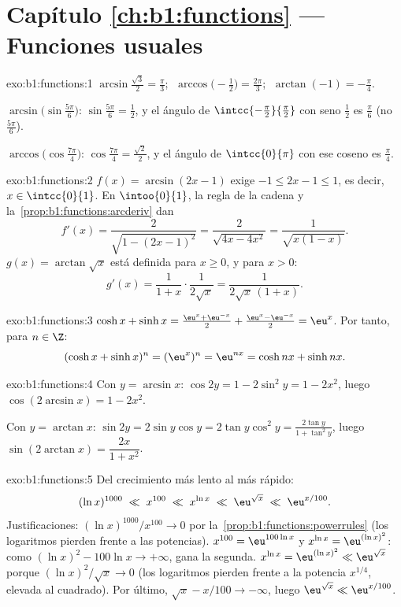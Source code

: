 \section*{Capítulo \ref{ch:b1:functions} --- Funciones usuales}

\begin{solution}{exo:b1:functions:1}
$\arcsin\frac{\sqrt 3}{2} = \frac\pi3$;
$\;\arccos\bigl(-\frac12\bigr) = \frac{2\pi}{3}$;
$\;\arctan(-1) = -\frac\pi4$.

$\arcsin\bigl(\sin\frac{5\pi}{6}\bigr)$: $\sin\frac{5\pi}{6} =
\frac12$, y el ángulo de $\intcc{-\frac\pi2}{\frac\pi2}$ con seno
$\frac12$ es $\frac\pi6$ (no $\frac{5\pi}{6}$).

$\arccos\bigl(\cos\frac{7\pi}{4}\bigr)$: $\cos\frac{7\pi}{4} =
\frac{\sqrt 2}{2}$, y el ángulo de $\intcc{0}{\pi}$ con ese coseno es
$\frac\pi4$.
\end{solution}

\begin{solution}{exo:b1:functions:2}
$f(x) = \arcsin(2x - 1)$ exige $-1 \leq 2x - 1 \leq 1$, es decir,
$x \in \intcc{0}{1}$. En $\intoo{0}{1}$, la regla de la cadena y
la~\cref{prop:b1:functions:arcderiv} dan
\[
f'(x) = \frac{2}{\sqrt{1 - (2x-1)^2}} = \frac{2}{\sqrt{4x - 4x^2}}
= \frac{1}{\sqrt{x(1 - x)}} .
\]
$g(x) = \arctan\sqrt x$ está definida para $x \geq 0$, y para $x > 0$:
\[
g'(x) = \frac{1}{1 + x} \cdot \frac{1}{2\sqrt x}
= \frac{1}{2\sqrt x\,(1 + x)} .
\]
\end{solution}

\begin{solution}{exo:b1:functions:3}
$\cosh x + \sinh x = \frac{\eu^x + \eu^{-x}}{2} + \frac{\eu^x -
\eu^{-x}}{2} = \eu^x$. Por tanto, para $n \in \Z$:
\[
(\cosh x + \sinh x)^n = (\eu^x)^n = \eu^{nx}
= \cosh nx + \sinh nx .
\]
\end{solution}

\begin{solution}{exo:b1:functions:4}
Con $y = \arcsin x$: $\cos 2y = 1 - 2\sin^2 y = 1 - 2x^2$, luego
$\cos(2\arcsin x) = 1 - 2x^2$.

Con $y = \arctan x$: $\sin 2y = 2 \sin y \cos y = 2 \tan y \cos^2 y =
\frac{2\tan y}{1 + \tan^2 y}$, luego $\sin(2\arctan x) =
\dfrac{2x}{1 + x^2}$.
\end{solution}

\begin{solution}{exo:b1:functions:5}
Del crecimiento más lento al más rápido:
\[
(\ln x)^{1000} \;\ll\; x^{100} \;\ll\; x^{\ln x} \;\ll\;
\eu^{\sqrt x} \;\ll\; \eu^{x/100} .
\]
Justificaciones: $(\ln x)^{1000}/x^{100} \to 0$ por
la~\cref{prop:b1:functions:powerrules} (los logaritmos pierden frente a
las potencias). $x^{100} = \eu^{100\ln x}$ y $x^{\ln x} =
\eu^{(\ln x)^2}$: como $(\ln x)^2 - 100\ln x \to +\infty$, gana la
segunda. $x^{\ln x} = \eu^{(\ln x)^2} \ll \eu^{\sqrt x}$ porque
$(\ln x)^2/\sqrt x \to 0$ (los logaritmos pierden frente a la potencia
$x^{1/4}$, elevada al cuadrado). Por último, $\sqrt x - x/100 \to
-\infty$, luego $\eu^{\sqrt x} \ll \eu^{x/100}$.
\end{solution}

